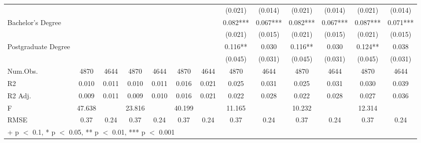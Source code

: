 \documentclass[
]{article}
\begin{document}
\begin{table}
{\begin{tabular}[t]{lcccccccccccc}
 &  &  &  &  &  &  & (\num{0.021}) & (\num{0.014}) & (\num{0.021}) & (\num{0.014}) & (\num{0.021}) & (\num{0.014})\\
Bachelor's Degree &  &  &  &  &  &  & \num{0.082}*** & \num{0.067}*** & \num{0.082}*** & \num{0.067}*** & \num{0.087}*** & \num{0.071}***\\
 &  &  &  &  &  &  & (\num{0.021}) & (\num{0.015}) & (\num{0.021}) & (\num{0.015}) & (\num{0.021}) & (\num{0.015})\\
Postgraduate Degree &  &  &  &  &  &  & \num{0.116}** & \num{0.030} & \num{0.116}** & \num{0.030} & \num{0.124}** & \num{0.038}\\
 &  &  &  &  &  &  & (\num{0.045}) & (\num{0.031}) & (\num{0.045}) & (\num{0.031}) & (\num{0.045}) & (\num{0.031})\\
\midrule
Num.Obs. & \num{4870} & \num{4644} & \num{4870} & \num{4644} & \num{4870} & \num{4644} & \num{4870} & \num{4644} & \num{4870} & \num{4644} & \num{4870} & \num{4644}\\
R2 & \num{0.010} & \num{0.011} & \num{0.010} & \num{0.011} & \num{0.016} & \num{0.021} & \num{0.025} & \num{0.031} & \num{0.025} & \num{0.031} & \num{0.030} & \num{0.039}\\
R2 Adj. & \num{0.009} & \num{0.011} & \num{0.009} & \num{0.010} & \num{0.016} & \num{0.021} & \num{0.022} & \num{0.028} & \num{0.022} & \num{0.028} & \num{0.027} & \num{0.036}\\
F & \num{47.638} &  & \num{23.816} &  & \num{40.199} &  & \num{11.165} &  & \num{10.232} &  & \num{12.314} & \\
RMSE & \num{0.37} & \num{0.24} & \num{0.37} & \num{0.24} & \num{0.37} & \num{0.24} & \num{0.37} & \num{0.24} & \num{0.37} & \num{0.24} & \num{0.37} & \num{0.24}\\
\bottomrule
\multicolumn{13}{l}{\rule{0pt}{1em}+ p $<$ 0.1, * p $<$ 0.05, ** p $<$ 0.01, *** p $<$ 0.001}\\
\end{tabular}}
\end{table}
\end{document}

